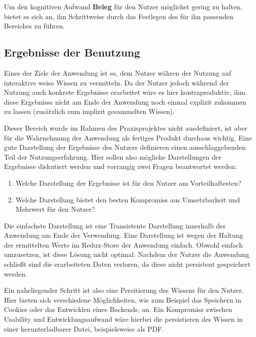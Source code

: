 Um den kognitiven Aufwand \textbf{Beleg} für den Nutzer möglichst gering zu halten, bietet es sich an, ihn Schrittweise durch das Festlegen des für ihn passenden Bereiches zu führen.

\subsection{Ergebnisse der Benutzung}
Eines der Ziele der Anwendung ist es, dem Nutzer währen der Nutzung auf interaktive weise Wissen zu vermitteln. Da der Nutzer jedoch während der Nutzung auch konkrete Ergebnisse erarbeitet wäre es hier kontraproduktiv, ihm diese Ergebnisse nicht am Ende der Anwendung noch einmal explizit zukommen zu lassen (zusätzlich zum implizit gesammelten Wissen).

Dieser Bereich wurde im Rahmen des Praxisprojektes nicht ausdefiniert, ist aber für die Wahrnehmung der Anwendung als fertiges Produkt durchaus wichtig. Eine gute Darstellung der Ergebnisse des Nutzers definieren einen ausschlaggebenden Teil der Nutzungserfahrung.
Hier sollen also mögliche Darstellungen der Ergebnisse diskutiert werden und vorrangig zwei Fragen beantwortet werden:
\begin{enumerate}
  \item Welche Darstellung der Ergebnisse ist für den Nutzer am Vorteilhaftesten?
  \item Welche Darstellung bietet den besten Kompromiss aus Umsetzbarkeit und Mehrwert für den Nutzer?
\end{enumerate}

Die einfachste Darstellung ist eine Transistente Darstellung innerhalb der Anwendung am Ende der Verwendung. Eine Darstellung ist wegen der Haltung der ermittelten Werte im Redux-Store der Anwendung einfach. Obwohl einfach umzusetzen, ist diese Lösung nicht optimal: Nachdem der Nutzer die Anwendung schließt sind die erarbeiteten Daten verloren, da diese nicht persistent gespeichert werden.

Ein naheliegender Schritt ist also eine Persitierung des Wissens für den Nutzer. Hier bieten sich verschiedene Möglichkeiten, wie zum Beispiel das Speichern in Cookies oder das Entwicklen eines Backends, an. Ein Kompromiss zwischen Usability und Entwicklungsaufwand wäre hierbei die persistieren des Wissen in einer herunterladbarer Datei, beispielsweise als PDF.

